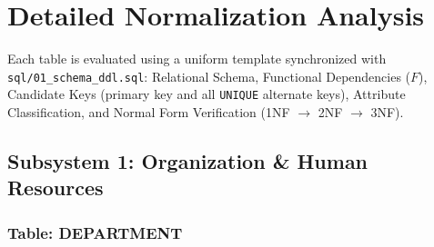 \documentclass[a4paper,12pt]{report}
\begin{document}
\section{Detailed Normalization Analysis}\label{detailed-normalization-analysis}

Each table is evaluated using a uniform template synchronized with \texttt{sql/01\_\allowbreak{}schema\_\allowbreak{}ddl.\allowbreak{}sql}: Relational Schema, Functional Dependencies (\(F\)), Candidate Keys (primary key and all \texttt{UNIQUE} alternate keys), Attribute Classification, and Normal Form Verification (1NF \(\rightarrow\) 2NF \(\rightarrow\) 3NF).

\subsection{Subsystem 1: Organization \& Human Resources}\label{subsystem-1-organization-human-resources}

\subsubsection{Table: DEPARTMENT}\label{table-department}
\end{document}
